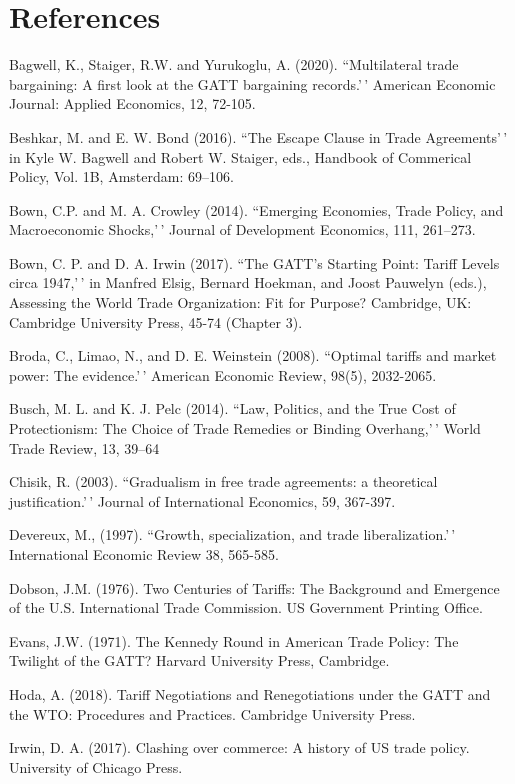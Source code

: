 \documentclass[
  12pt,
]{article}
\begin{document}
\hypertarget{references}{%
\section{References}\label{references}}

Bagwell, K., Staiger, R.W. and Yurukoglu, A. (2020). ``Multilateral trade bargaining: A first look at the GATT bargaining records.'\,' American Economic Journal: Applied Economics, 12, 72-105.

Beshkar, M. and E. W. Bond (2016). ``The Escape Clause in Trade Agreements'\,' in Kyle W. Bagwell and Robert W. Staiger, eds., Handbook of Commerical Policy, Vol. 1B, Amsterdam: 69--106.

Bown, C.P. and M. A. Crowley (2014). ``Emerging Economies, Trade Policy, and Macroeconomic Shocks,'\,' Journal of Development Economics, 111, 261--273.

Bown, C. P. and D. A. Irwin (2017). ``The GATT's Starting Point: Tariff Levels circa 1947,'\,' in Manfred Elsig, Bernard Hoekman, and Joost Pauwelyn (eds.), Assessing the World Trade Organization: Fit for Purpose? Cambridge, UK: Cambridge University Press, 45-74 (Chapter 3).

Broda, C., Limao, N., and D. E. Weinstein (2008). ``Optimal tariffs and market power: The
evidence.'\,' American Economic Review, 98(5), 2032-2065.

Busch, M. L. and K. J. Pelc (2014). ``Law, Politics, and the True Cost of Protectionism: The Choice of Trade Remedies or Binding Overhang,'\,' World Trade Review, 13, 39--64

Chisik, R. (2003). ``Gradualism in free trade agreements: a theoretical justification.'\,' Journal of International Economics, 59, 367-397.

Devereux, M., (1997). ``Growth, specialization, and trade liberalization.'\,' International Economic Review
38, 565-585.

Dobson, J.M. (1976). Two Centuries of Tariffs: The Background and Emergence of the U.S. International Trade Commission. US Government Printing Office.

Evans, J.W. (1971). The Kennedy Round in American Trade Policy: The Twilight of the GATT? Harvard University Press, Cambridge.

Hoda, A. (2018). Tariff Negotiations and Renegotiations under the GATT and the WTO: Procedures and Practices. Cambridge University Press.

Irwin, D. A. (2017). Clashing over commerce: A history of US trade policy. University of Chicago Press.
\end{document}
